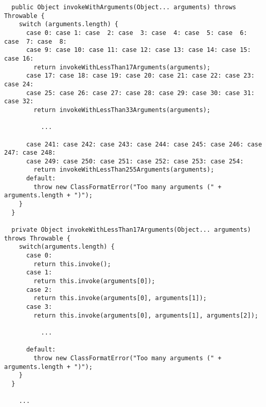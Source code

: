 {\tiny \begin{verbatim}
  public Object invokeWithArguments(Object... arguments) throws Throwable {
    switch (arguments.length) {
      case 0: case 1: case  2: case  3: case  4: case  5: case  6: case  7: case  8:
      case 9: case 10: case 11: case 12: case 13: case 14: case 15: case 16:
        return invokeWithLessThan17Arguments(arguments);
      case 17: case 18: case 19: case 20: case 21: case 22: case 23: case 24:
      case 25: case 26: case 27: case 28: case 29: case 30: case 31: case 32:
        return invokeWithLessThan33Arguments(arguments);

          ...

      case 241: case 242: case 243: case 244: case 245: case 246: case 247: case 248:
      case 249: case 250: case 251: case 252: case 253: case 254:
        return invokeWithLessThan255Arguments(arguments);
      default:
        throw new ClassFormatError("Too many arguments (" + arguments.length + ")");
    }
  }

  private Object invokeWithLessThan17Arguments(Object... arguments) throws Throwable {
    switch(arguments.length) {
      case 0:
        return this.invoke();
      case 1:
        return this.invoke(arguments[0]);
      case 2:
        return this.invoke(arguments[0], arguments[1]);
      case 3:
        return this.invoke(arguments[0], arguments[1], arguments[2]);

          ...

      default:
        throw new ClassFormatError("Too many arguments (" + arguments.length + ")");
    }
  }

    ...
\end{verbatim} }